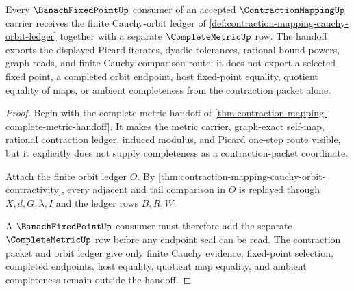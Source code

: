 \begin{theorem}
\label{thm:contraction-mapping-banach-handoff}
Every $\BanachFixedPointUp$ consumer of an accepted $\ContractionMappingUp$ carrier receives the finite Cauchy-orbit ledger of \autoref{def:contraction-mapping-cauchy-orbit-ledger} together with a separate $\CompleteMetricUp$ row. The handoff exports the displayed Picard iterates, dyadic tolerances, rational bound powers, graph reads, and finite Cauchy comparison route; it does not export a selected fixed point, a completed orbit endpoint, host fixed-point equality, quotient equality of maps, or ambient completeness from the contraction packet alone.
\end{theorem}
\begin{proof}
Begin with the complete-metric handoff of \autoref{thm:contraction-mapping-complete-metric-handoff}. It makes the metric carrier, graph-exact self-map, rational contraction ledger, induced modulus, and Picard one-step route visible, but it explicitly does not supply completeness as a contraction-packet coordinate.

Attach the finite orbit ledger $O$. By \autoref{thm:contraction-mapping-cauchy-orbit-contractivity}, every adjacent and tail comparison in $O$ is replayed through $X,d,G,\lambda,I$ and the ledger rows $B,R,W$.

A $\BanachFixedPointUp$ consumer must therefore add the separate $\CompleteMetricUp$ row before any endpoint seal can be read. The contraction packet and orbit ledger give only finite Cauchy evidence; fixed-point selection, completed endpoints, host equality, quotient map equality, and ambient completeness remain outside the handoff.
\end{proof}

